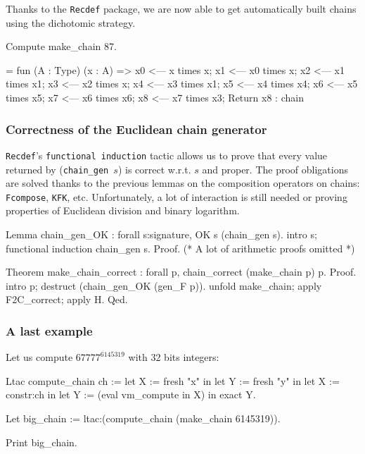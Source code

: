 Thanks to the \texttt{Recdef} package, we are now able to get automatically 
built chains using the dichotomic strategy.


\begin{Coqsrc}
Compute make_chain 87.
\end{Coqsrc}

\begin{Coqanswer}
 =  fun (A : Type) (x : A) =>
       x0 <--- x times x;
       x1 <--- x0 times x;
       x2 <--- x1 times x1;
       x3 <--- x2 times x;
       x4 <--- x3 times x1;
       x5 <--- x4 times x4;
       x6 <--- x5 times x5;
       x7 <--- x6 times x6; 
       x8 <--- x7 times x3; 
       Return x8
     : chain 
\end{Coqanswer}


\subsubsection{Correctness of the Euclidean chain generator}

\texttt{Recdef}'s \texttt{functional induction} tactic allows us to
prove that every value returned by (\texttt{chain\_gen $s$}) is correct w.r.t. 
\texttt{$s$} and proper.
The proof obligations are solved thanks to the previous lemmas on 
the composition operators on chains: \texttt{Fcompose}, \texttt{KFK}, etc.
Unfortunately, a lot of interaction is still needed or proving properties of
Euclidean division and binary logarithm. 



\begin{Coqsrc}
Lemma chain_gen_OK : forall s:signature, OK  s (chain_gen  s).
intro s; functional induction chain_gen s.
Proof.
(* A lot of arithmetic proofs omitted *)

Theorem make_chain_correct :
    forall p, chain_correct (make_chain p) p.
Proof.
 intro p; destruct (chain_gen_OK (gen_F p)).
 unfold make_chain; apply F2C_correct; apply H.
Qed.
\end{Coqsrc}

\subsubsection{A last example}
\label{ex45319}

Let us compute  $67777^{6145319}$ with 32 bits integers:

\begin{Coqsrc}

Ltac compute_chain ch := 
   let X := fresh "x" in 
   let Y := fresh "y" in
   let X := constr:ch in 
   let Y := (eval vm_compute in X) in 
   exact Y.

Let big_chain := ltac:(compute_chain  (make_chain 6145319)).

Print big_chain.
\end{Coqsrc}


